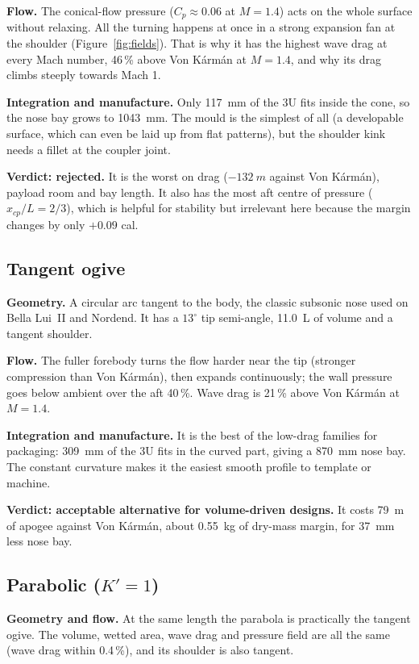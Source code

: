 \textbf{Flow.} The conical-flow pressure ($C_p \approx 0.06$ at $M=1.4$) acts on the whole surface
without relaxing. All the turning happens at once in a strong expansion fan at the shoulder
(Figure~\ref{fig:fields}). That is why it has the highest wave drag at every Mach number, 46\,\%
above Von K\'arm\'an at $M=1.4$, and why its drag climbs steeply towards Mach 1.

\textbf{Integration and manufacture.} Only \SI{117}{mm} of the 3U fits inside the cone, so the nose
bay grows to \SI{1043}{mm}. The mould is the simplest of all (a developable surface, which can even
be laid up from flat patterns), but the shoulder kink needs a fillet at the coupler joint.

\textbf{Verdict: rejected.} It is the worst on drag ($-\SI{132}{m}$ against Von K\'arm\'an), payload
room and bay length. It also has the most aft centre of pressure ($x_{cp}/L = 2/3$), which is
helpful for stability but irrelevant here because the margin changes by only $+0.09$ cal.

\subsection{Tangent ogive}

\textbf{Geometry.} A circular arc tangent to the body, the classic subsonic nose used on
Bella Lui~II and Nordend. It has a $13^\circ$ tip semi-angle, \SI{11.0}{L} of volume and a tangent
shoulder.

\textbf{Flow.} The fuller forebody turns the flow harder near the tip (stronger compression than
Von K\'arm\'an), then expands continuously; the wall pressure goes below ambient over the aft
40\,\%. Wave drag is 21\,\% above Von K\'arm\'an at $M=1.4$.

\textbf{Integration and manufacture.} It is the best of the low-drag families for packaging:
\SI{309}{mm} of the 3U fits in the curved part, giving a \SI{870}{mm} nose bay. The constant
curvature makes it the easiest smooth profile to template or machine.

\textbf{Verdict: acceptable alternative for volume-driven designs.} It costs \SI{79}{m} of apogee
against Von K\'arm\'an, about \SI{0.55}{kg} of dry-mass margin, for \SI{37}{mm} less nose bay.

\subsection{Parabolic ($K' = 1$)}

\textbf{Geometry and flow.} At the same length the parabola is practically the tangent ogive. The
volume, wetted area, wave drag and pressure field are all the same (wave drag within 0.4\,\%), and its
shoulder is also tangent.

